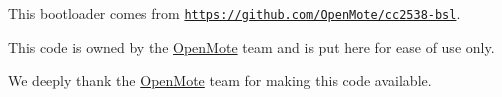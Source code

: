 This bootloader comes from \href{https://github.com/OpenMote/cc2538-bsl}{\tt https\+://github.\+com/\+Open\+Mote/cc2538-\/bsl}.

This code is owned by the \hyperlink{struct_open_mote}{Open\+Mote} team and is put here for ease of use only.

We deeply thank the \hyperlink{struct_open_mote}{Open\+Mote} team for making this code available. 